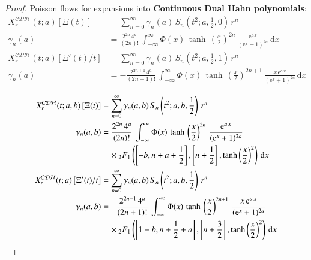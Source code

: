 \documentclass[a4paper,11pt,twoside]{amsart}
\newcommand{\verifiedeq}{=}
\newcommand{\verifiedeq}{\stackrel{\checkmark}{=}}
\begin{document}
\begin{proof}
Poisson flows for expansions into \textbf{Continuous Dual Hahn polynomials}:
\begin{align}
X^\mathcal{CDH}_r(t;a)\left[\Xi(t)\right] &\verifiedeq \sum_{n=0}^\infty \gamma_{n}(a)\,S_{n}\left(t^2;a,\frac12,0\right)\,r^{n} \\
\gamma_n(a) &\verifiedeq \frac{2^{2n}\,4^a}{(2n)!}\,\int_{-\infty}^{\infty} \Phi(x)\,\tanh\,\left(\frac{x}{2}\right)^{2n}\,\frac{\textrm{e}^{a\,x}}{(\textrm{e}^x+1)^{2a}}\,\mathrm{d}x \\
X^\mathcal{CDH}_r(t;a)\left[\Xi'(t)/t\right] &\verifiedeq \sum_{n=0}^\infty \gamma_{n}(a)\,S_{n}\left(t^2;a,\frac12,1\right)\,r^{n} \\
\gamma_n(a) &\verifiedeq -\frac{2^{2n+1}\,4^a}{(2n+1)!}\,\int_{-\infty}^{\infty} \Phi(x)\,\tanh\,\left(\frac{x}{2}\right)^{2n+1}\,\frac{x\,\textrm{e}^{a\,x}}{(\textrm{e}^x+1)^{2a}}\,\mathrm{d}x
\end{align}

\begin{align}
X^\mathcal{CDH}_r(t;a,b)\left[\Xi(t)\right] &\verifiedeq \sum_{n=0}^\infty \gamma_{n}(a,b)\,S_{n}\left(t^2;a,b,\frac12\right)\,r^{n} \\
\gamma_n(a,b) &\verifiedeq \frac{2^{2n}\,4^a}{(2n)!}\,\int_{-\infty}^{\infty} \Phi(x)\,\tanh\,\left(\frac{x}{2}\right)^{2n}\,\frac{\textrm{e}^{a\,x}}{(\textrm{e}^x+1)^{2a}} \\ &\quad \times {}_2F_1\left(\left[-b, n+a+\frac12\right],\left[n+\frac12\right],\tanh\left(\frac{x}{2}\right)^2\right)\,\mathrm{d}x \notag \\
X^\mathcal{CDH}_r(t;a)\left[\Xi'(t)/t\right] &\verifiedeq \sum_{n=0}^\infty \gamma_{n}(a,b)\,S_{n}\left(t^2;a,b,\frac12\right)\,r^{n} \\
\gamma_n(a,b) &\verifiedeq -\frac{2^{2n+1}\,4^a}{(2n+1)!}\,\int_{-\infty}^{\infty} \Phi(x)\,\tanh\,\left(\frac{x}{2}\right)^{2n+1}\,\frac{x\,\textrm{e}^{a\,x}}{(\textrm{e}^x+1)^{2a}}\\\ &\quad\times{}_2F_1\left(\left[1-b, n+\frac12+a\right],\left[n+\frac32\right],\tanh\left(\frac{x}{2}\right)^2\right)\,\mathrm{d}x \notag
\end{align}


\end{proof}
\end{document}
